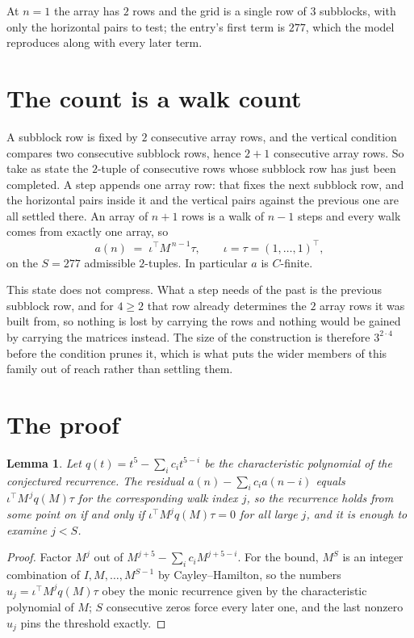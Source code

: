 \documentclass[11pt,a4paper]{article}
\theoremstyle{plain}
\newtheorem{lemma}[theorem]{Lemma}
\theoremstyle{definition}
\begin{document}
At $n=1$ the array has $2$ rows and the grid is a single row of $3$
subblocks, with only the horizontal pairs to test; the entry's first term is
$277$, which the model reproduces along with every later term.

\section{The count is a walk count}

A subblock row is fixed by $2$ consecutive array rows, and the vertical condition compares
two consecutive subblock rows, hence $2+1$ consecutive array rows. So take as state the
$2$-tuple of consecutive rows whose subblock row has just been completed. A step appends one
array row: that fixes the next subblock row, and the horizontal pairs inside it and the
vertical pairs against the previous one are all settled there. An array of $n+1$ rows is
a walk of $n-1$ steps and every walk comes from exactly one array, so
\[
a(n)\;=\;\iota^{\!\top}M^{\,n-1}\tau,\qquad\iota=\tau=(1,\dots,1)^{\!\top},
\]
on the $S=277$ admissible $2$-tuples. In particular $a$ is $C$-finite.

This state does not compress. What a step needs of the past is the previous subblock row, and
for $4\ge2$ that row already determines the $2$ array rows it was built from, so nothing
is lost by carrying the rows and nothing would be gained by carrying the matrices instead. The
size of the construction is therefore $3^{2\cdot4}$ before the condition prunes
it, which is what puts the wider members of this family out of reach rather than settling them.

\section{The proof}

\begin{lemma}\label{lem:crit}
Let $q(t)=t^{5}-\sum_i c_it^{5-i}$ be the characteristic polynomial of the
conjectured recurrence. The residual $a(n)-\sum_ic_ia(n-i)$ equals
$\iota^{\!\top}M^{\,j}q(M)\tau$ for the corresponding walk index $j$, so the recurrence
holds from some point on if and only if $\iota^{\!\top}M^{j}q(M)\tau=0$ for all large $j$,
and it is enough to examine $j<S$.
\end{lemma}

\begin{proof}
Factor $M^{j}$ out of $M^{j+5}-\sum_ic_iM^{j+5-i}$. For the bound, $M^{S}$
is an integer combination of $I,M,\dots,M^{S-1}$ by Cayley--Hamilton, so the numbers
$u_j=\iota^{\!\top}M^{j}q(M)\tau$ obey the monic recurrence given by the characteristic
polynomial of $M$; $S$ consecutive zeros force every later one, and the last nonzero $u_j$
pins the threshold exactly.
\end{proof}
\end{document}
